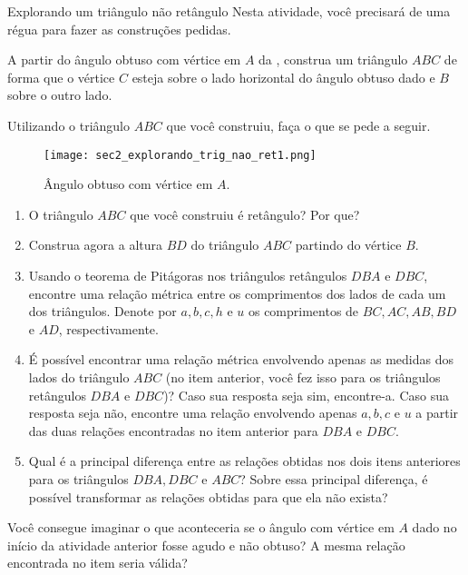 \begin{task}{Explorando um triângulo não retângulo}
Nesta atividade, você precisará de uma régua para fazer as construções pedidas.

A partir do ângulo obtuso com vértice em $A$ da , construa um triângulo $ABC$ de forma que o vértice $C$ esteja sobre o lado horizontal do ângulo obtuso dado e $B$ sobre o outro lado. 

Utilizando o triângulo $ABC$ que você construiu, faça o que se pede a seguir.
\begin{figure}[H]
    \centering
    \texttt{[image: sec2\_explorando\_trig\_nao\_ret1.png]}
    \caption{Ângulo obtuso com vértice em $A$.}
    \label{sec2_explorando_trig_nao_ret_fig}
\end{figure}

\begin{enumerate}
    \item{}
    O triângulo $ABC$ que você construiu é retângulo? Por que?
    
    \item{}
    Construa agora a altura $BD$ do triângulo $ABC$ partindo do vértice $B$. 
    
    \item{}
    Usando o teorema de Pitágoras nos triângulos retângulos $DBA$ e $DBC$, encontre uma relação métrica entre os comprimentos dos lados de cada um dos triângulos. Denote por $a, b, c, h$ e $u$ os comprimentos de $BC, AC, AB, BD$ e $AD$, respectivamente. 
    
    \item{}
    É possível encontrar uma relação métrica envolvendo apenas as medidas dos lados do triângulo $ABC$ (no item anterior, você fez isso para os triângulos retângulos $DBA$ e $DBC$)? Caso sua resposta seja sim, encontre-a. Caso sua resposta seja não, encontre uma relação envolvendo apenas $a, b, c$ e $u$ a partir das duas relações encontradas no item anterior para $DBA$ e $DBC$.
    
    \item{}
    Qual é a principal diferença entre as relações obtidas nos dois itens anteriores para os triângulos $DBA, DBC$ e $ABC$? Sobre essa principal diferença, é possível transformar as relações obtidas para que ela não exista?
    
    \end{enumerate}
\end{task}

\begin{reflection}
Você consegue imaginar o que aconteceria se o ângulo com vértice em $A$ dado no início da atividade anterior fosse agudo e não obtuso? A mesma relação encontrada no item  seria válida?
\end{reflection}


